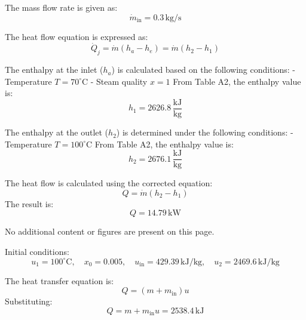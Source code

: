The mass flow rate is given as:  
\[
\dot{m}_{\text{in}} = 0.3 \, \text{kg/s}
\]

The heat flow equation is expressed as:  
\[
\dot{Q}_j = \dot{m}(h_a - h_e) = \dot{m}(h_2 - h_1)
\]

The enthalpy at the inlet (\( h_a \)) is calculated based on the following conditions:  
- Temperature \( T = 70^\circ\text{C} \)  
- Steam quality \( x = 1 \)  
From Table A2, the enthalpy value is:  
\[
h_1 = 2626.8 \, \frac{\text{kJ}}{\text{kg}}
\]

The enthalpy at the outlet (\( h_2 \)) is determined under the following conditions:  
- Temperature \( T = 100^\circ\text{C} \)  
From Table A2, the enthalpy value is:  
\[
h_2 = 2676.1 \, \frac{\text{kJ}}{\text{kg}}
\]

The heat flow is calculated using the corrected equation:  
\[
Q = \dot{m}(h_2 - h_1)
\]  
The result is:  
\[
Q = 14.79 \, \text{kW}
\]

No additional content or figures are present on this page.

Initial conditions:  
\[
u_1 = 100^\circ\text{C}, \quad x_0 = 0.005, \quad u_{\text{in}} = 429.39 \, \text{kJ/kg}, \quad u_2 = 2469.6 \, \text{kJ/kg}
\]  

The heat transfer equation is:  
\[
Q = (m + m_{\text{in}}) u
\]  
Substituting:  
\[
Q = m + m_{\text{in}} u = 2538.4 \, \text{kJ}
\]